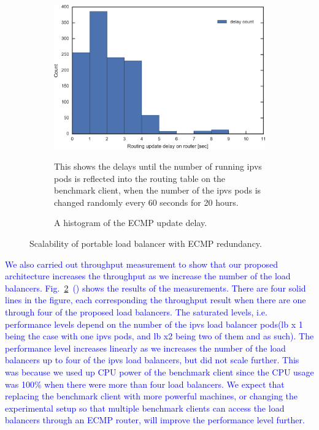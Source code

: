 \begin{figure}[t]
  \par\bigskip

  \begin{subfigure}[t]{\columnwidth}
    \includegraphics[width=0.9\columnwidth,left]{Figs/ecmp_delay_histgram_ieice}
  \caption{A histogram of the ECMP update delay.}
This shows the delays until the number of running ipvs pods is reflected into the routing table on the benchmark client,
when the number of the ipvs pods is changed randomly every 60 seconds for 20 hours.
    \label{fig:ecmp_delay_histgram_ieice}
  \end{subfigure}

  \caption{Scalability of portable load balancer with ECMP redundancy.}
  \label{fig:ecmp_scalability}

\end{figure}

\textcolor{blue}{
We also carried out throughput measurement to show that our proposed architecture increases the throughput as we increase the number of the load balancers.
Fig.~\ref{fig:ecmp_scalability}~() shows the results of the measurements.
There are four solid lines in the figure, each corresponding the throughput result when there are one through four of the proposed load balancers.
The saturated levels, i.e. performance levels depend on the number of the ipvs load balancer pods(lb x 1 being the case with one ipvs pods, and lb x2 being two of them and as such). The performance level increases linearly as we increases the number of the load balancers up to four of the ipvs load balancers, but did not scale further.
This was because we used up CPU power of the benchmark client since the CPU usage was 100\% when there were more than four load balancers.
We expect that replacing the benchmark client with more powerful machines, or changing the experimental setup so that multiple benchmark clients can access the load balancers through an ECMP router, will improve the performance level further.
}

